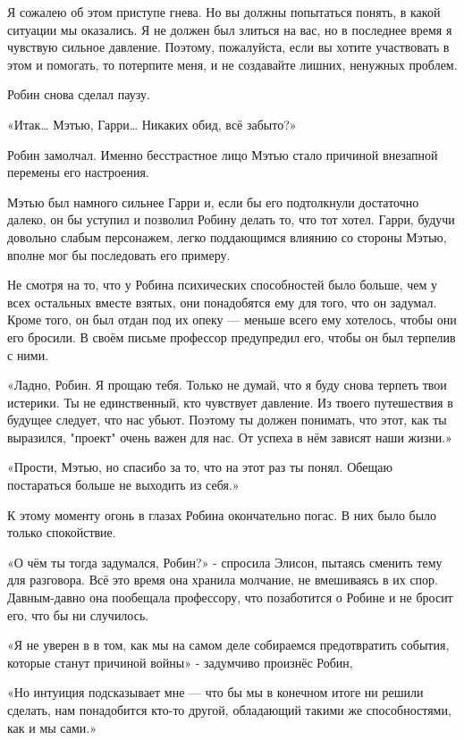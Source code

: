 \documentclass[a4paper,12pt]{book}
\begin{document}
Я сожалею об этом приступе гнева. Но вы должны попытаться понять, в какой ситуации мы оказались. Я не должен был злиться на вас, но в последнее время я чувствую сильное давление. Поэтому, пожалуйста, если вы хотите участвовать в этом и помогать, то потерпите меня, и не создавайте лишних, ненужных проблем.
\par
Робин снова сделал паузу.
\par
«Итак… Мэтью, Гарри… Никаких обид, всё забыто?»\\
\par
Робин замолчал. Именно бесстрастное лицо Мэтью стало причиной внезапной перемены его настроения.
\par
Мэтью был намного сильнее Гарри и, если бы его подтолкнули достаточно далеко, он бы уступил и позволил Робину делать то, что тот хотел. Гарри, будучи довольно слабым персонажем, легко поддающимся влиянию со стороны Мэтью, вполне мог бы последовать его примеру.
\par
Не смотря на то, что у Робина психических способностей было больше, чем у всех остальных вместе взятых, они понадобятся ему для того, что он задумал. Кроме того, он был отдан под их опеку — меньше всего ему хотелось, чтобы они его бросили. В своём письме профессор предупредил его, чтобы он был терпелив с ними.
\par
«Ладно, Робин. Я прощаю тебя. Только не думай, что я буду снова терпеть твои истерики. Ты не единственный, кто чувствует давление. Из твоего путешествия в будущее следует, что нас убьют. Поэтому ты должен понимать, что этот, как ты выразился, "проект" очень важен для нас. От успеха в нём зависят наши жизни.»
\par
«Прости, Мэтью, но спасибо за то, что на этот раз ты понял. Обещаю постараться больше не выходить из себя.»
\par
К этому моменту огонь в глазах Робина окончательно погас. В них было было только спокойствие.
\par
«О чём ты тогда задумался, Робин?» - спросила Элисон, пытаясь сменить тему для разговора. Всё это время она хранила молчание, не вмешиваясь в их спор. Давным-давно она пообещала профессору, что позаботится о Робине и не бросит его, что бы ни случилось.
\par
«Я не уверен в в том, как мы на самом деле собираемся предотвратить события, которые станут причиной войны» - задумчиво произнёс Робин,
\par
«Но интуиция подсказывает мне — что бы мы в конечном итоге ни решили сделать, нам понадобится кто-то другой, обладающий такими же способностями, как и мы сами.»
\end{document}
